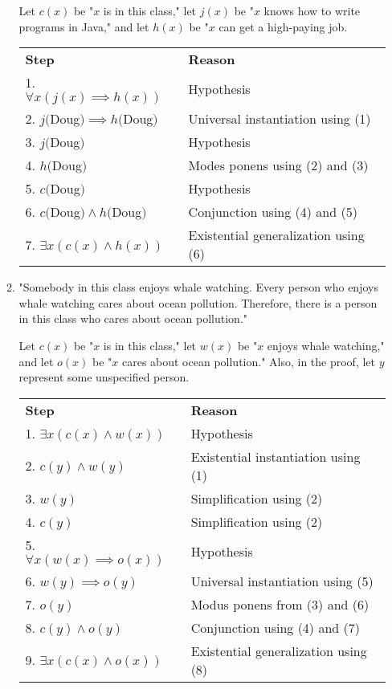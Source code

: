 \documentclass[11pt]{article}
\begin{document}
\begin{enumerate}[label=\textbf{\arabic*.}]
\begin{enumerate}[label=\textbf{\alph*)}]
		Let $c(x)$ be "$x$ is in this class," let $j(x)$ be "$x$ knows how to write programs in Java," and let $h(x)$ be "$x$ can get a high-paying job.
		
		\begin{center}
		\begin{tabular}{ll}
			\textbf{Step} & \textbf{Reason} \\
			1. $\forall x(j(x) \implies h(x))$ & Hypothesis \\
			2. $j($Doug$) \implies h($Doug$)$ & Universal instantiation using (1) \\
			3. $j($Doug$)$ & Hypothesis \\
			4. $h($Doug$)$ & Modes ponens using (2) and (3) \\
			5. $c($Doug$)$ & Hypothesis \\
			6. $c($Doug$) \land h($Doug$)$ & Conjunction using (4) and (5) \\
			7. $\exists x(c(x) \land h(x))$ & Existential generalization using (6) 
		\end{tabular}
		\end{center}
		
		\item "Somebody in this class enjoys whale watching. Every person who enjoys whale watching cares about ocean pollution. Therefore, there is a person in this class who cares about ocean pollution."
		
		Let $c(x)$ be "$x$ is in this class," let $w(x)$ be "$x$ enjoys whale watching," and let $o(x)$ be "$x$ cares about ocean pollution." Also, in the proof, let $y$ represent some unspecified person.
		
		\begin{center}
		\begin{tabular}{ll}
			\textbf{Step} & \textbf{Reason} \\
			1. $\exists x(c(x) \land w(x))$ & Hypothesis \\
			2. $c(y) \land w(y)$ & Existential instantiation using (1) \\
			3. $w(y)$ & Simplification using (2) \\
			4. $c(y)$ & Simplification using (2) \\
			5. $\forall x(w(x) \implies o(x))$ & Hypothesis \\
			6. $w(y) \implies o(y)$ & Universal instantiation using (5) \\
			7. $o(y)$ & Modus ponens from (3) and (6) \\
			8. $c(y) \land o(y)$ & Conjunction using (4) and (7) \\
			9. $\exists x(c(x) \land o(x))$ & Existential generalization using (8)
		\end{tabular}
		\end{center}
		

\end{enumerate}
\end{enumerate}
\end{document}

